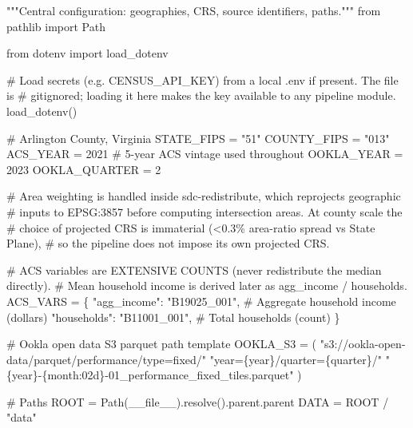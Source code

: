 \documentclass[
  letterpaper,
  DIV=11,
  numbers=noendperiod]{scrreprt}
\newenvironment{Shaded}{\begin{snugshade}}{\end{snugshade}}
\newcommand{\CommentTok}[1]{\textcolor[rgb]{0.37,0.37,0.37}{#1}}
\newcommand{\DecValTok}[1]{\textcolor[rgb]{0.68,0.00,0.00}{#1}}
\newcommand{\ImportTok}[1]{\textcolor[rgb]{0.00,0.46,0.62}{#1}}
\newcommand{\NormalTok}[1]{\textcolor[rgb]{0.00,0.23,0.31}{#1}}
\newcommand{\OperatorTok}[1]{\textcolor[rgb]{0.37,0.37,0.37}{#1}}
\newcommand{\SpecialCharTok}[1]{\textcolor[rgb]{0.37,0.37,0.37}{#1}}
\newcommand{\StringTok}[1]{\textcolor[rgb]{0.13,0.47,0.30}{#1}}
\newcommand{\VariableTok}[1]{\textcolor[rgb]{0.07,0.07,0.07}{#1}}
\begin{document}
\begin{Shaded}
\begin{Highlighting}[]
\CommentTok{"""Central configuration: geographies, CRS, source identifiers, paths."""}
\ImportTok{from}\NormalTok{ pathlib }\ImportTok{import}\NormalTok{ Path}

\ImportTok{from}\NormalTok{ dotenv }\ImportTok{import}\NormalTok{ load\_dotenv}

\CommentTok{\# Load secrets (e.g. CENSUS\_API\_KEY) from a local .env if present. The file is}
\CommentTok{\# gitignored; loading it here makes the key available to any pipeline module.}
\NormalTok{load\_dotenv()}

\CommentTok{\# Arlington County, Virginia}
\NormalTok{STATE\_FIPS }\OperatorTok{=} \StringTok{"51"}
\NormalTok{COUNTY\_FIPS }\OperatorTok{=} \StringTok{"013"}
\NormalTok{ACS\_YEAR }\OperatorTok{=} \DecValTok{2021}          \CommentTok{\# 5{-}year ACS vintage used throughout}
\NormalTok{OOKLA\_YEAR }\OperatorTok{=} \DecValTok{2023}
\NormalTok{OOKLA\_QUARTER }\OperatorTok{=} \DecValTok{2}

\CommentTok{\# Area weighting is handled inside sdc{-}redistribute, which reprojects geographic}
\CommentTok{\# inputs to EPSG:3857 before computing intersection areas. At county scale the}
\CommentTok{\# choice of projected CRS is immaterial (\textless{}0.3\% area{-}ratio spread vs State Plane),}
\CommentTok{\# so the pipeline does not impose its own projected CRS.}

\CommentTok{\# ACS variables are EXTENSIVE COUNTS (never redistribute the median directly).}
\CommentTok{\# Mean household income is derived later as agg\_income / households.}
\NormalTok{ACS\_VARS }\OperatorTok{=}\NormalTok{ \{}
    \StringTok{"agg\_income"}\NormalTok{: }\StringTok{"B19025\_001"}\NormalTok{,   }\CommentTok{\# Aggregate household income (dollars)}
    \StringTok{"households"}\NormalTok{: }\StringTok{"B11001\_001"}\NormalTok{,   }\CommentTok{\# Total households (count)}
\NormalTok{\}}

\CommentTok{\# Ookla open data S3 parquet path template}
\NormalTok{OOKLA\_S3 }\OperatorTok{=}\NormalTok{ (}
    \StringTok{"s3://ookla{-}open{-}data/parquet/performance/type=fixed/"}
    \StringTok{"year=}\SpecialCharTok{\{year\}}\StringTok{/quarter=}\SpecialCharTok{\{quarter\}}\StringTok{/"}
    \StringTok{"}\SpecialCharTok{\{year\}}\StringTok{{-}}\SpecialCharTok{\{month:02d\}}\StringTok{{-}01\_performance\_fixed\_tiles.parquet"}
\NormalTok{)}

\CommentTok{\# Paths}
\NormalTok{ROOT }\OperatorTok{=}\NormalTok{ Path(}\VariableTok{\_\_file\_\_}\NormalTok{).resolve().parent.parent}
\NormalTok{DATA }\OperatorTok{=}\NormalTok{ ROOT }\OperatorTok{/} \StringTok{"data"}


\end{Highlighting}
\end{Shaded}
\end{document}
